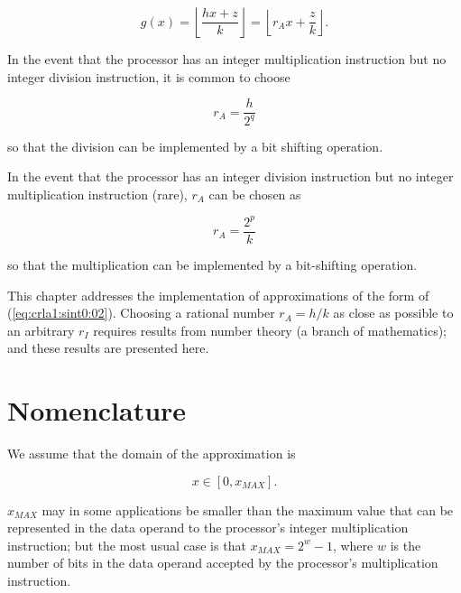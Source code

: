 \begin{equation}
\label{eq:crla1:sint0:03}
g(x) = 
\left\lfloor \frac{hx + z}{k} \right\rfloor
=
\left\lfloor r_Ax + \frac{z}{k} \right\rfloor. 
\end{equation}

In the event that the processor has an integer multiplication instruction but
no integer division instruction, it is common to choose 

\begin{equation}
\label{eq:crla1:sint0:04}
r_A = \frac{h}{2^q}
\end{equation}

\noindent{}so that the division can be implemented by a bit shifting
operation.

In the event that the processor has an integer division instruction but
no integer multiplication instruction (rare), $r_A$ can be chosen as

\begin{equation}
\label{eq:crla1:sint0:05}
r_A = \frac{2^p}{k}
\end{equation}

\noindent{}so that the multiplication can be implemented by a bit-shifting
operation.

This chapter addresses the implementation of approximations of
the form of (\ref{eq:crla1:sint0:02}).  Choosing a rational number
$r_A = h/k$ as close as possible to an arbitrary $r_I$ requires 
results from number theory (a branch of mathematics); and these
results are presented here.


\section{Nomenclature}
\label{crla1:snom0}

We assume that the domain of the approximation is

\begin{equation}
\label{eq:crla1:snom0:01}
x \in [0, x_{MAX}] .
\end{equation}

\noindent{}$x_{MAX}$ may in some applications be smaller than the maximum value that 
can be represented in
the data operand to the processor's integer multiplication instruction; but
the most usual case is that $x_{MAX} = 2^w-1$, where $w$ is the number of bits
in the data operand accepted by the processor's multiplication instruction.

